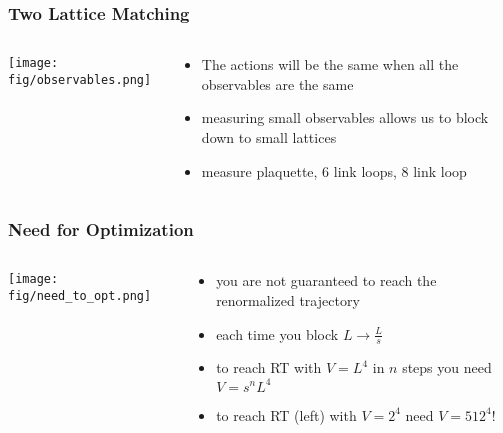 \documentclass{beamer}
\begin{document}
  \begin{frame}
    \frametitle{Two Lattice Matching}
    \begin{columns}[T]
      \begin{column}{.5\textwidth}
        \begin{block}{}
          \texttt{[image: fig/observables.png]}
        \end{block}
      \end{column}
      \begin{column}{.5\textwidth}
        \begin{block}{}
          \begin{itemize}
            \item The actions will be the same when all the observables are the same
            \item measuring small observables allows us to block down to small lattices
            \item measure plaquette, 6 link loops, 8 link loop
          \end{itemize}
        \end{block}
      \end{column}
    \end{columns}
  \end{frame}

  \begin{frame}
    \frametitle{Need for Optimization}
    \begin{columns}[T]
      \begin{column}{.5\textwidth}
        \begin{block}{}
          \texttt{[image: fig/need\_to\_opt.png]}
        \end{block}
      \end{column}
      \begin{column}{.5\textwidth}
        \begin{block}{}
          \begin{itemize}
            \item you are not guaranteed to reach the renormalized trajectory
            \item each time you block $L\rightarrow\frac{L}{s}$
            \item to reach RT with $V=L^4$ in $n$ steps you need $V=s^nL^{4}$
            \item to reach RT (left) with $V=2^4$ need $V=512^4$!
          \end{itemize}
        \end{block}
      \end{column}
    \end{columns}
  \end{frame}
\end{document}
